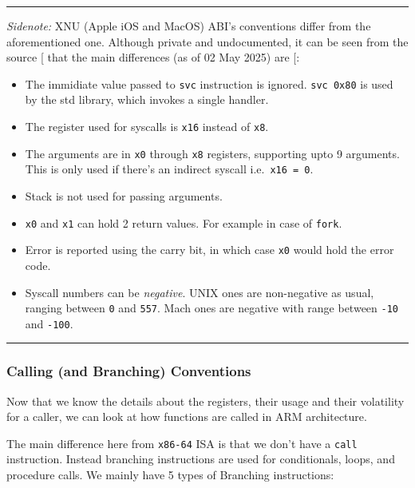 \documentclass[a4paper, nobind]{templates/ociamthesis}
\providecommand{\tightlist}{%
  \setlength{\itemsep}{0pt}\setlength{\parskip}{0pt}}
\begin{document}
\begin{center}\rule{0.5\linewidth}{0.5pt}\end{center}

\emph{Sidenote:} XNU (Apple iOS and MacOS) ABI's conventions differ from the aforementioned one.
Although private and undocumented, it can be seen from the source {[}\citeproc{ref-apple-oss}{31}{]} that
the main differences (as of 02 May 2025) are {[}\citeproc{ref-so-xnu-abi}{50}{]}:

\begin{itemize}
\tightlist
\item
  The immidiate value passed to \texttt{svc} instruction is ignored. \texttt{svc\ 0x80} is used
  by the std library, which invokes a single handler.
\item
  The register used for syscalls is \texttt{x16} instead of \texttt{x8}.
\item
  The arguments are in \texttt{x0} through \texttt{x8} registers, supporting upto 9 arguments.
  This is only used if there's an indirect syscall i.e.~\texttt{x16\ =\ 0}.
\item
  Stack is not used for passing arguments.
\item
  \texttt{x0} and \texttt{x1} can hold 2 return values. For example in case of \texttt{fork}.
\item
  Error is reported using the carry bit, in which case \texttt{x0} would hold
  the error code.
\item
  Syscall numbers can be \emph{negative}.
  UNIX ones are non-negative as usual, ranging between \texttt{0} and \texttt{557}.
  Mach ones are negative with range between \texttt{-10} and \texttt{-100}.
\end{itemize}

\begin{center}\rule{0.5\linewidth}{0.5pt}\end{center}

\subsubsection{Calling (and Branching) Conventions}\label{calling-and-branching-conventions}

Now that we know the details about the registers, their usage and their volatility for a caller,
we can look at how functions are called in ARM architecture.

The main difference here from \texttt{x86-64} ISA is that we don't have a \texttt{call} instruction.
Instead branching instructions are used for conditionals, loops, and procedure calls.
We mainly have 5 types of Branching instructions:
\end{document}
